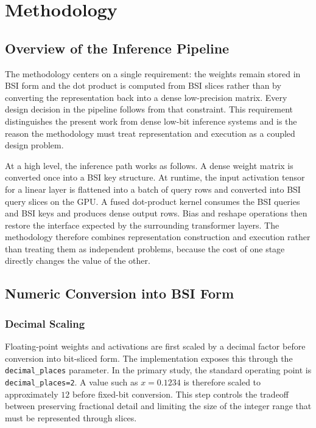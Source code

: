 \chapter{Methodology}

\section{Overview of the Inference Pipeline}
The methodology centers on a single requirement: the weights remain stored in BSI form and the dot product is computed from BSI slices rather than by converting the representation back into a dense low-precision matrix. Every design decision in the pipeline follows from that constraint. This requirement distinguishes the present work from dense low-bit inference systems and is the reason the methodology must treat representation and execution as a coupled design problem.

At a high level, the inference path works as follows. A dense weight matrix is converted once into a BSI key structure. At runtime, the input activation tensor for a linear layer is flattened into a batch of query rows and converted into BSI query slices on the GPU. A fused dot-product kernel consumes the BSI queries and BSI keys and produces dense output rows. Bias and reshape operations then restore the interface expected by the surrounding transformer layers. The methodology therefore combines representation construction and execution rather than treating them as independent problems, because the cost of one stage directly changes the value of the other.

\section{Numeric Conversion into BSI Form}
\subsection{Decimal Scaling}
Floating-point weights and activations are first scaled by a decimal factor before conversion into bit-sliced form. The implementation exposes this through the \texttt{decimal\_places} parameter. In the primary study, the standard operating point is \texttt{decimal\_places=2}. A value such as \(x=0.1234\) is therefore scaled to approximately \(12\) before fixed-bit conversion. This step controls the tradeoff between preserving fractional detail and limiting the size of the integer range that must be represented through slices.


